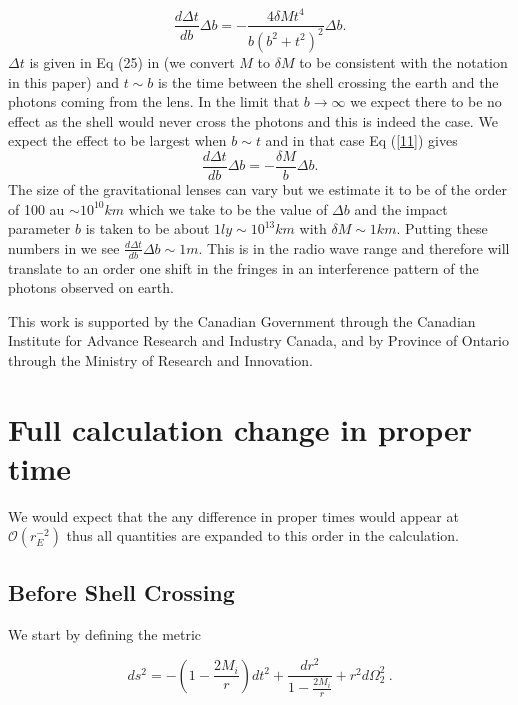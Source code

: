 \documentclass[aps,showpacs,twocolumn,floats,prd,superscriptaddress,nofootinbib]{revtex4-1}
\begin{document}
\begin{equation}
	\frac{d \Delta t}{d b} \Delta b = - \frac{4\delta Mt^4}{b(b^2 + t^2)^2} \Delta b.	\label{11}
\end{equation}
$\Delta t$ is given in Eq (25) in \cite{Olum:2013gza} (we convert $M$ to $\delta M$ to be consistent with the notation in this paper) and $t \sim b$ is the time between the shell crossing the earth and the photons coming from the lens. In the limit that $b\rightarrow \infty$ we expect there to be no effect as the shell would never cross the photons and this is indeed the case. We expect the effect to be largest when $b \sim t$ and in that case Eq (\ref{11}) gives
\begin{equation}
	\frac{d \Delta t}{db } \Delta b = - \frac{\delta M}{b} \Delta b.
\end{equation}
The size of the gravitational lenses can vary but we estimate it to be of the order of 100 au $\sim 10^{10} km$ which we take to be the value of $\Delta b$ and the impact parameter $b$ is taken to be about $1 ly \sim 10^{13} km$ with $\delta M \sim 1 km$. Putting these numbers in we see $\frac{d \Delta t}{db} \Delta b \sim 1 m$. This is in the radio wave range and therefore will translate to an order one shift in the fringes in an interference pattern of the photons observed on earth.

\acknowledgments

This work is supported by the Canadian Government through the Canadian Institute for Advance Research and Industry Canada, and by Province of Ontario through the Ministry of Research and Innovation.

\appendix

\section{Full calculation change in proper time}

We would expect that the any difference in proper times would appear at $\mathcal{O}(r_E^{-2})$ thus all quantities are expanded to this order in the calculation. 

\subsection{Before Shell Crossing}

We start by defining the metric

\begin{equation}
ds^2 = -\left(1-\frac{2M_i}{r}\right)dt^2 + \frac{dr^2}{1-\frac{2M_i}{r}}+r^2d\Omega_2^2~.
\end{equation}
\end{document}
